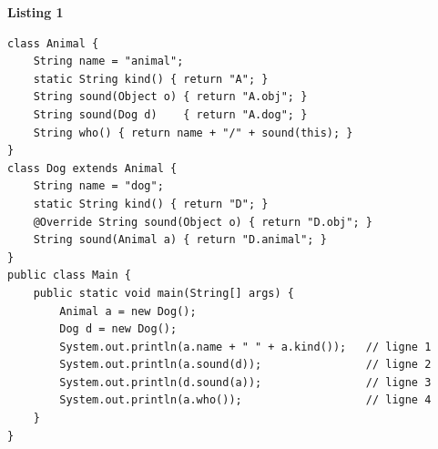 \documentclass[border=10pt]{standalone}
\begin{document}
\pagecolor{paper}\begin{minipage}{16.5cm}\vspace{4pt}
\textbf{\small\color{gray}Listing 1}\par\vspace{2pt}
\lstset{style=sv}
\begin{lstlisting}
class Animal {
    String name = "animal";
    static String kind() { return "A"; }
    String sound(Object o) { return "A.obj"; }
    String sound(Dog d)    { return "A.dog"; }
    String who() { return name + "/" + sound(this); }
}
class Dog extends Animal {
    String name = "dog";
    static String kind() { return "D"; }
    @Override String sound(Object o) { return "D.obj"; }
    String sound(Animal a) { return "D.animal"; }
}
public class Main {
    public static void main(String[] args) {
        Animal a = new Dog();
        Dog d = new Dog();
        System.out.println(a.name + " " + a.kind());   // ligne 1
        System.out.println(a.sound(d));                // ligne 2
        System.out.println(d.sound(a));                // ligne 3
        System.out.println(a.who());                   // ligne 4
    }
}
\end{lstlisting}
\vspace{2pt}\end{minipage}
\end{document}
